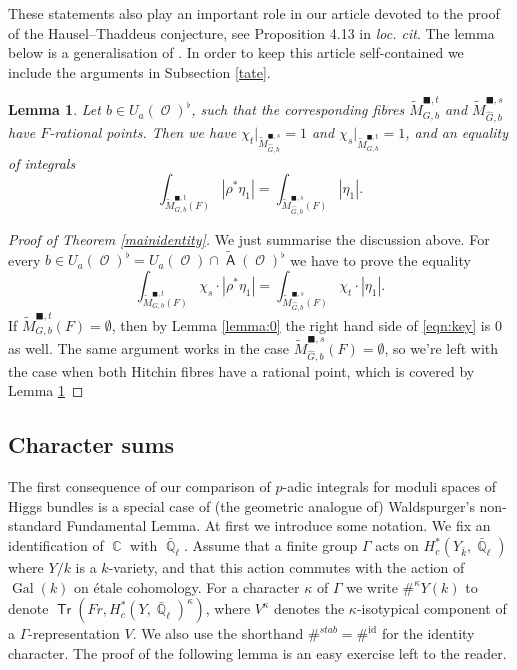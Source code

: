 \documentclass{article}
\DeclareMathOperator{\A}{\mathsf{A}}
\DeclareMathOperator{\Cb}{\mathbb{C}}
\DeclareMathOperator{\id}{id}
\DeclareMathOperator{\Gal}{Gal}
\DeclareMathOperator{\Tr}{\mathsf{Tr}}
\DeclareMathOperator{\Oo}{\mathcal{O}}
\DeclareMathOperator{\Qb}{\mathbb{Q}}
\theoremstyle{definition}
\theoremstyle{plain}
\newtheorem{lemma}[definition]{Lemma}
\begin{document}
These statements also play an important role in our article \cite{gwz} devoted to the proof of the Hausel--Thaddeus conjecture, see Proposition 4.13 in \emph{loc. cit}. The lemma below is a generalisation of \cite[Lemma 4.11]{gwz}. In order to keep this article self-contained we include the arguments in Subsection \ref{tate}.

\begin{lemma}\label{lemma:1}
Let $b \in U_a(\Oo)^{\flat}$, such that the corresponding fibres $\widetilde{M}^{\blacksquare,t}_{G,b}$ and $\widetilde{M}^{\blacksquare,s}_{\widehat{G},b}$ have $F$-rational points. Then we have $\chi_t|_{\widetilde{M}^{\blacksquare,s}_{\widehat{G},b}} = 1$ and $\chi_s|_{\widetilde{M}^{\blacksquare,t}_{G,b}} = 1$, and an equality of integrals
$$\int_{ \widetilde{M}_{G,b}^{\blacksquare,t}(F) }  |\rho^* \eta_1|=  \int_{ \widetilde{M}_{\widehat{G},b}^{\blacksquare,s}(F) } |\eta_1|. $$ 
\end{lemma}


\begin{proof}[Proof of Theorem \ref{mainidentity}] We just summarise the discussion above. For every $b \in U_a(\Oo)^{\flat} = U_a(\Oo) \cap \widetilde{\A}(\Oo)^{\flat}$ we have to prove the equality
\begin{equation}\label{eqn:key} \int_{ \widetilde{M}_{G,b}^{\blacksquare,t}(F) } \chi_s \cdot |\rho^* \eta_1| =  \int_{ \widetilde{M}_{\widehat{G},b}^{\blacksquare,s}(F) } \chi_t \cdot |\eta_1|. \end{equation}
If $\widetilde{M}_{G,b}^{\blacksquare,t}(F) = \emptyset$, then by Lemma \ref{lemma:0} the right hand side of \eqref{eqn:key} is $0$ as well. The same argument works in the case $\widetilde{M}_{\widehat{G},b}^{\blacksquare,s}(F) = \emptyset$, so we're left with the case when both Hitchin fibres have a rational point, which is covered by Lemma \ref{lemma:1}
\end{proof} 

\subsection{Character sums}\label{character}

The first consequence of our comparison of $p$-adic integrals for moduli spaces of Higgs bundles is a special case of (the geometric analogue of) Waldspurger's non-standard Fundamental Lemma. At first we introduce some notation. We fix an identification of $\Cb$ with $\bar{\Qb}_{\ell}$. Assume that a finite group $\Gamma$ acts on $H^*_c(Y_{\bar{k}},\bar{\Qb}_{\ell})$ where $Y/k$ is a $k$-variety, and that this action commutes with the action of $\Gal(k)$ on \'etale cohomology. For a character $\kappa$ of $\Gamma$ we write $\#^{\kappa}Y(k)$ to denote $\Tr(Fr,H^*_{c}(Y,\bar{\Qb}_{\ell})^{\kappa})$, where $V^{\kappa}$ denotes the $\kappa$-isotypical component of a $\Gamma$-representation $V$. We also use the shorthand $\#^{stab} = \#^{\id}$ for the identity character. The proof of the following lemma is an easy exercise left to the reader.
\end{document}

